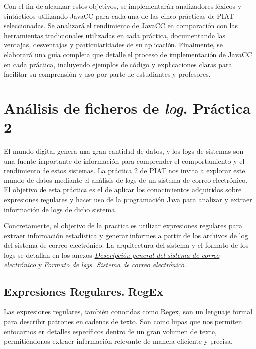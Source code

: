 
Con el fin de alcanzar estos objetivos, se implementarán analizadores léxicos y sintácticos utilizando JavaCC para cada una de las cinco prácticas de PIAT seleccionadas. Se analizará el rendimiento de JavaCC en comparación con las herramientas tradicionales utilizadas en cada práctica, documentando las ventajas, desventajas y particularidades de su aplicación. Finalmente, se elaborará una guía completa que detalle el proceso de implementación de JavaCC en cada práctica, incluyendo ejemplos de código y explicaciones claras para facilitar su comprensión y uso por parte de estudiantes y profesores.

\section{Análisis de ficheros de \textit{log}. Práctica 2}

\noindent El mundo digital genera una gran cantidad de datos, y los logs de sistemas son una fuente importante de información para comprender el comportamiento y el rendimiento de estos sistemas. La práctica 2 de PIAT nos invita a explorar este mundo de datos mediante el análisis de logs de un sistema de correo electrónico. El objetivo de esta práctica es el de aplicar los conocimientos adquiridos sobre expresiones regulares y hacer uso de la programación Java para analizar y extraer información de logs de dicho sistema.

Concretamente, el objetivo de la practica es utilizar expresiones regulares para extraer información estadística y generar informes a partir de los archivos de log del sistema de correo electrónico. La arquitectura del sistema y el formato de los logs se detallan en los anexos \hyperref[sec:P2SistemaCorreo]{\textit{Descripción general del sistema de correo electrónico}} y \hyperref[sec:logscorreo]{\textit{Formato de logs. Sistema de correo electrónico}}.


\subsection{Expresiones Regulares. RegEx}

\noindent Las expresiones regulares, también conocidas como Regex, son un lenguaje formal para describir patrones en cadenas de texto. Son como lupas que nos permiten enfocarnos en detalles específicos dentro de un gran volumen de texto, permitiéndonos extraer información relevante de manera eficiente y precisa.

